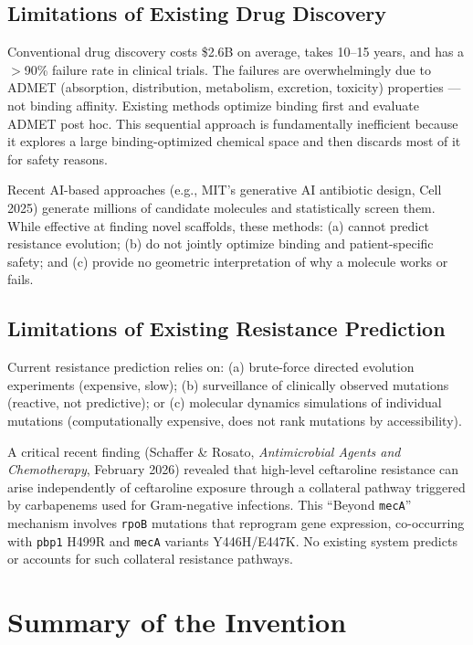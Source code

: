 \documentclass[11pt]{article}
\begin{document}
\subsection{Limitations of Existing Drug Discovery}

Conventional drug discovery costs \$2.6B on average, takes 10--15 years, and has a
$>$90\% failure rate in clinical trials. The failures are overwhelmingly due to ADMET
(absorption, distribution, metabolism, excretion, toxicity) properties — not binding
affinity. Existing methods optimize binding first and evaluate ADMET post hoc. This
sequential approach is fundamentally inefficient because it explores a large binding-optimized
chemical space and then discards most of it for safety reasons.

Recent AI-based approaches (e.g., MIT's generative AI antibiotic design, Cell 2025) generate
millions of candidate molecules and statistically screen them. While effective at finding
novel scaffolds, these methods: (a) cannot predict resistance evolution; (b) do not jointly
optimize binding and patient-specific safety; and (c) provide no geometric interpretation of
why a molecule works or fails.

\subsection{Limitations of Existing Resistance Prediction}

Current resistance prediction relies on: (a) brute-force directed evolution experiments
(expensive, slow); (b) surveillance of clinically observed mutations (reactive, not
predictive); or (c) molecular dynamics simulations of individual mutations (computationally
expensive, does not rank mutations by accessibility).

A critical recent finding (Schaffer \& Rosato, \emph{Antimicrobial Agents and Chemotherapy},
February 2026) revealed that high-level ceftaroline resistance can arise independently of
ceftaroline exposure through a collateral pathway triggered by carbapenems used for
Gram-negative infections. This ``Beyond \texttt{mecA}'' mechanism involves \texttt{rpoB}
mutations that reprogram gene expression, co-occurring with \texttt{pbp1} H499R and
\texttt{mecA} variants Y446H/E447K. No existing system predicts or accounts for such
collateral resistance pathways.

\section{Summary of the Invention}
\end{document}
